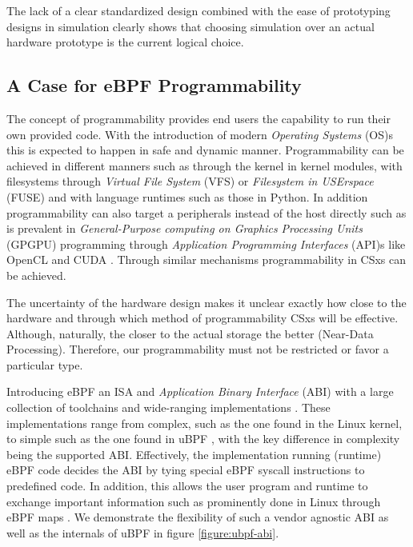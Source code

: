 The lack of a clear standardized design combined with the ease of prototyping
designs in simulation clearly shows that choosing simulation over an actual
hardware prototype is the current logical choice.

\subsection{A Case for eBPF Programmability}

The concept of programmability provides end users the capability to run their
own provided code. With the introduction of modern \textit{Operating Systems}
(OS)s this is expected to happen in safe and dynamic manner. Programmability
can be achieved in different manners such as through the kernel in kernel
modules, with filesystems through \textit{Virtual File System} (VFS) \cite{vfs}
or \textit{Filesystem in USErspace} (FUSE) \cite{fuse} and with language
runtimes such as those in Python. In addition programmability can also target a
peripherals instead of the host directly such as is prevalent in
\textit{General-Purpose computing on Graphics Processing Units} (GPGPU)
programming through \textit{Application Programming Interfaces} (API)s like
OpenCL \cite{opencl} and CUDA \cite{cuda}. Through similar mechanisms
programmability in CSxs can be achieved.

The uncertainty of the hardware design makes it unclear exactly how close to the
hardware and through which method of programmability CSxs will be effective.
Although, naturally, the closer to the actual storage the better
(Near-Data Processing). Therefore, our programmability must not be restricted or
favor a particular type.

Introducing eBPF an ISA and \textit{Application Binary Interface} (ABI) with a
large collection of toolchains and wide-ranging implementations
\cite{what-ebpf, McCanne1993TheBP}. These implementations range from complex,
such as the one found in the Linux kernel, to simple such as the one found in
uBPF \cite{ubpf}, with the key difference in complexity being the supported ABI.
Effectively, the implementation running (runtime) eBPF code decides the ABI by
tying special eBPF syscall instructions to predefined code. In addition, this
allows the user program and runtime to exchange important information such as
prominently done in Linux through eBPF maps \cite{bpf-man}. We demonstrate the
flexibility of such a vendor agnostic ABI as well as the internals of uBPF in
figure \ref{figure:ubpf-abi}.

